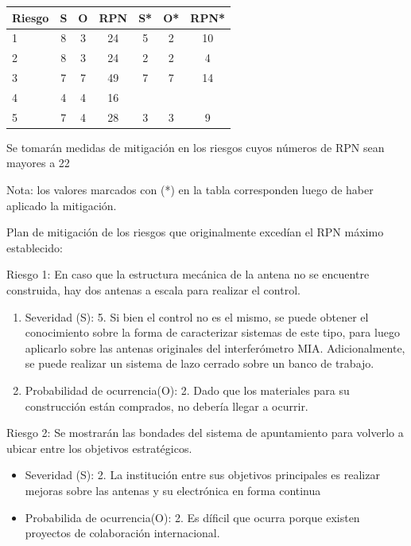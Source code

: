 \documentclass[11pt, %
codirector, %
]{charter}
\begin{document}
\begin{table}[htpb]
\centering
\begin{tabularx}{\linewidth}{@{}|X|c|c|c|c|c|c|@{}}
\hline
\rowcolor[HTML]{C0C0C0} 
Riesgo & S  & O  & RPN & S*  & O* & RPN* \\ \hline
   1   & 8  & 3  &  24 & 5   & 2  & 10     \\ \hline
   2   & 8  & 3  &  24 & 2   & 2  &  4    \\ \hline
   3   & 7  & 7  &  49 & 7   & 7  &  14   \\ \hline
   4   & 4  & 4  &  16 &     &    &      \\ \hline
   5   & 7  & 4  &  28 & 3   & 3  &  9    \\ \hline
   
\end{tabularx}
\end{table}

Se tomarán medidas de mitigación en los riesgos cuyos números de RPN sean mayores a 22 



Nota: los valores marcados con (*) en la tabla corresponden luego de haber aplicado la mitigación.

Plan de mitigación de los riesgos que originalmente excedían el RPN máximo establecido:
 
Riesgo 1: En caso que la estructura mecánica de la antena no se encuentre construida, hay dos antenas a escala para realizar el control. 
\begin{enumerate}
	\item Severidad (S): 5. \newline
	Si bien el control no es el mismo, se puede obtener el conocimiento sobre la forma de caracterizar sistemas de este tipo, para luego aplicarlo sobre las antenas originales del interferómetro MIA. Adicionalmente, se puede realizar un sistema de lazo cerrado sobre un banco de trabajo.   
	\item Probabilidad de ocurrencia(O): 2.\newline 
	Dado que los materiales para su construcción están comprados, no debería llegar a ocurrir. 
	
\end{enumerate} 

Riesgo 2: Se mostrarán las bondades del sistema de apuntamiento para volverlo a ubicar entre los objetivos estratégicos. 
\begin{itemize}
	\item Severidad (S): 2. \newline
	La institución entre sus objetivos principales es realizar mejoras sobre las antenas y su electrónica en forma continua 
	\item Probabilida de ocurrencia(O): 2. 
	Es díficil que ocurra porque existen proyectos de colaboración internacional. 
\end{itemize}
\end{document}

